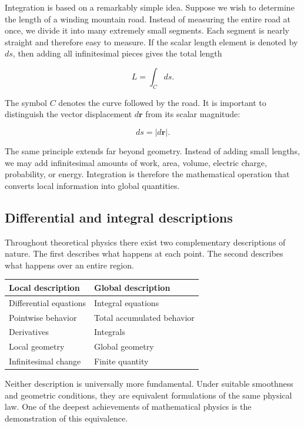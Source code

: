 Integration is based on a remarkably simple idea. Suppose we wish to determine
the length of a winding mountain road. Instead of measuring the entire road at
once, we divide it into many extremely small segments. Each segment is nearly
straight and therefore easy to measure. If the scalar length element is denoted
by $ds$, then adding all infinitesimal pieces gives the total length

\begin{equation}
  \boxed{L=\int_C ds.}
\end{equation}

The symbol $C$ denotes the curve followed by the road. It is important to
distinguish the vector displacement $d\mathbf r$ from its scalar magnitude:

\begin{equation}
  ds=\lvert d\mathbf r\rvert.
\end{equation}

The same principle extends far beyond geometry. Instead of adding small
lengths, we may add infinitesimal amounts of work, area, volume, electric
charge, probability, or energy. Integration is therefore the mathematical
operation that converts local information into global quantities.

\subsection{Differential and integral descriptions}

Throughout theoretical physics there exist two complementary descriptions of
nature. The first describes what happens at each point. The second describes
what happens over an entire region.

\begin{center}
\begin{tabular}{ll}
\toprule
\textbf{Local description} & \textbf{Global description} \\
\midrule
Differential equations & Integral equations \\
Pointwise behavior & Total accumulated behavior \\
Derivatives & Integrals \\
Local geometry & Global geometry \\
Infinitesimal change & Finite quantity \\
\bottomrule
\end{tabular}
\end{center}

Neither description is universally more fundamental. Under suitable
smoothness and geometric conditions, they are equivalent formulations of the
same physical law. One of the deepest achievements of mathematical physics is
the demonstration of this equivalence.

